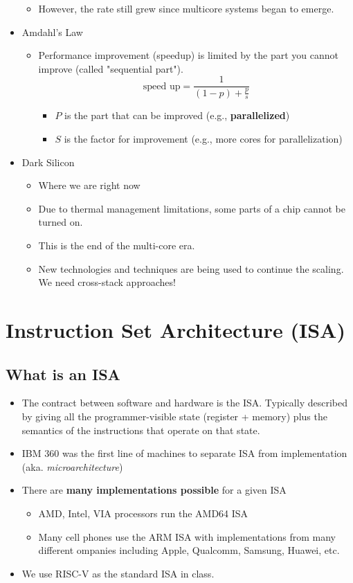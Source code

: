 \documentclass[10pt]{article}
\begin{document}
\begin{itemize}
\begin{itemize}
        \item However, the rate still grew since multicore systems began to emerge.
    \end{itemize}
    \item Amdahl's Law
    \begin{itemize}
        \item Performance improvement (speedup) is limited by the part you cannot improve (called "sequential part").
        \[\text{speed up} = \frac{1}{(1 - p) + \frac{p}{s}}\]
        \begin{itemize}
            \item $P$ is the part that can be improved (e.g., \textbf{parallelized})
            \item $S$ is the factor for improvement (e.g., more cores for parallelization)
        \end{itemize}
    \end{itemize}
    \item Dark Silicon
    \begin{itemize}
        \item Where we are right now
        \item Due to thermal management limitations, some parts of a chip cannot be turned on.
        \item This is the end of the multi-core era.  
        \item New technologies and techniques are being used to continue the scaling.  We need cross-stack approaches!
    \end{itemize}
\end{itemize}

\section*{Instruction Set Architecture (ISA)}
\subsection*{What is an ISA}
\begin{itemize}
    \item The contract between software and hardware is the ISA.  Typically described by giving all the programmer-visible state (register + memory) plus the semantics of the instructions that operate on that state.
    \item IBM 360 was the first line of machines to separate ISA from implementation (aka. \textit{microarchitecture})
    \item There are \textbf{many implementations possible} for a given ISA
    \begin{itemize}
        \item AMD, Intel, VIA processors run the AMD64 ISA
        \item Many cell phones use the ARM ISA with implementations from many different ompanies including Apple, Qualcomm, Samsung, Huawei, etc.
    \end{itemize}
    \item We use RISC-V as the standard ISA in class.
\end{itemize}
\end{document}
